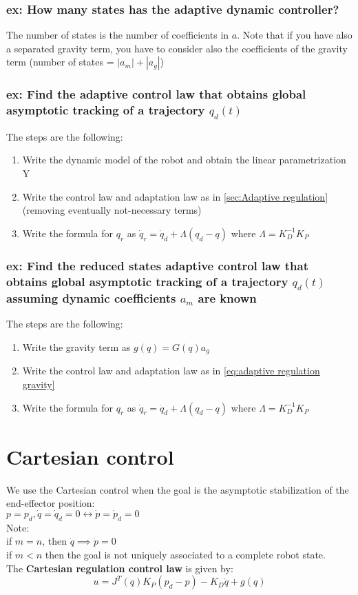 \documentclass[a4paper,12pt]{article}
\begin{document}
\subsubsection{ex: How many states has the adaptive dynamic controller?}
The number of states is the number of coefficients 
in $a$. Note that if you have also a separated 
gravity term, you have to consider also the
coefficients of the gravity term (number of states = $ |a_m| + |a_g|$)
\subsubsection{ex: Find the adaptive control law that obtains global 
asymptotic tracking of a trajectory $q_d(t)$}
The steps are the following:
\begin{enumerate}
    \item Write the dynamic model of the robot and 
    obtain the linear parametrization Y
    \item Write the control law and adaptation law as in \ref{sec:Adaptive regulation}
    (removing eventually not-necessary terms)
    \item Write the formula for $q_r$ as $\dot{q}_r = \dot{q}_d + \Lambda(q_d - q)$
    where $\Lambda=K_D^{-1}K_P$
\end{enumerate}
\subsubsection{ex: Find the reduced states adaptive control law that 
obtains global 
asymptotic tracking of a trajectory $q_d(t)$ assuming 
dynamic coefficients $a_m$ are known}
The steps are the following:
\begin{enumerate}
    \item Write the gravity term as $g(q) = G(q)a_g$
    \item Write the control law and adaptation law as in \ref{eq:adaptive regulation gravity}
    \item Write the formula for $q_r$ as $\dot{q}_r = \dot{q}_d + \Lambda(q_d - q)$
    where $\Lambda=K_D^{-1}K_P$
\end{enumerate}





\section{Cartesian control}
We use the Cartesian control when the goal is the 
asymptotic stabilization of the end-effector position:\\
$p=p_d, \dot{q}=\dot{q}_d=0 \leftrightarrow \dot{p}=\dot{p}_d=0$\\
Note:\\
if $m= n$, then $\dot{q} \implies \dot{p} = 0$\\
if $m<n$ then the goal is not uniquely associated
to a complete robot state.\\
The \textbf{Cartesian regulation control law} is given by:
\begin{equation}\label{eq:Cartesian regulation control law}
    u = J^T(q)K_P(p_d-p) - K_D\dot{q}+g(q)
\end{equation}
\end{document}
